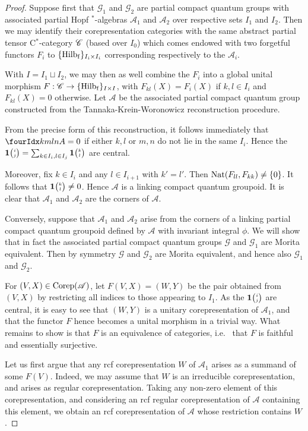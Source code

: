 \begin{proof} Suppose first that $\mathscr{G}_1$ and $\mathscr{G}_2$ are partial compact quantum groups with associated partial Hopf $^*$-algebras $\mathscr{A}_1$ and $\mathscr{A}_2$ over respective sets $I_1$ and $I_2$. Then we may identify their corepresentation categories with the same abstract partial tensor C$^*$-category $\mathscr{C}$ (based over $I_0$) which comes endowed with two forgetful functors $F_i$ to $\{\mathrm{Hilb}_{\operatorname{\mathrm{f}}}\}_{I_i\times I_i}$ corresponding respectively to the $\mathscr{A}_i$.

With $I = I_1\sqcup I_2$, we may then as well combine the $F_i$ into a global unital morphism $F:\mathscr{C} \rightarrow \{\mathrm{Hilb}_{\operatorname{\mathrm{f}}}\}_{I\times I}$, with $F_{kl}(X)=F_i(X)$ if $k,l\in I_i$ and $F_{kl}(X)=0$ otherwise. Let $\mathscr{A}$ be the associated partial compact quantum group constructed from the Tannaka-Krein-Woronowicz reconstruction procedure. 

From the precise form of this reconstruction, it follows immediately that $\Gr{A}{k}{l}{m}{n} =0$ if either $k,l$ or $m,n$ do not lie in the same $I_i$. Hence the $\mathbf{1}{\tiny {\begin{pmatrix} i\\j\end{pmatrix}}} = \sum_{k\in I_i,l\in I_j} \mathbf{1}{\tiny {\begin{pmatrix} k\\l\end{pmatrix}}}$ are central. 

Moreover, fix $k\in I_i$ and any $l\in I_{i+1}$ with $k'=l'$. Then $\operatorname{\mathrm{Nat}}(F_{ll},F_{kk})\neq \{0\}$. It follows that $\mathbf{1}{\tiny {\begin{pmatrix} k\\l\end{pmatrix}}}\neq 0$. Hence $\mathscr{A}$ is a linking compact quantum groupoid. It is clear that $\mathscr{A}_1$ and $\mathscr{A}_2$ are the corners of $\mathscr{A}$. 

Conversely, suppose that $\mathscr{A}_1$ and $\mathscr{A}_2$ arise from the corners of a linking partial compact quantum groupoid defined by $\mathscr{A}$ with invariant integral $\phi$. We will show that in fact the associated partial compact quantum groups $\mathscr{G}$ and $\mathscr{G}_1$ are Morita equivalent. Then by symmetry $\mathscr{G}$ and $\mathscr{G}_2$ are Morita equivalent, and hence also $\mathscr{G}_1$ and $\mathscr{G}_2$.

For $(V,X) \in \mathrm{Corep}(\mathscr{A})$, let $F(V,X) = (W,Y)$ be the pair obtained from $(V,X)$ by restricting all indices to those appearing to $I_1$. As the $\mathbf{1}{\tiny {\begin{pmatrix} i\\j\end{pmatrix}}}$ are central, it is easy to see that $(W,Y)$ is a unitary corepresentation of $\mathscr{A}_1$, and that the functor $F$ hence becomes a unital morphism in a trivial way. What remains to show is that $F$ is an equivalence of categories, i.e.~ that $F$ is faithful and essentially surjective. 

Let us first argue that any rcf corepresentation $W$ of $\mathscr{A}_1$ arises as a summand of some $F(V)$. Indeed, we may assume that $W$ is an irreducible corepresentation, and arises as regular corepresentation. Taking any non-zero element of this corepresentation, and considering an rcf regular corepresentation of $\mathscr{A}$ containing this element, we obtain an rcf corepresentation of $\mathscr{A}$ whose restriction contains $W$.


\end{proof}
